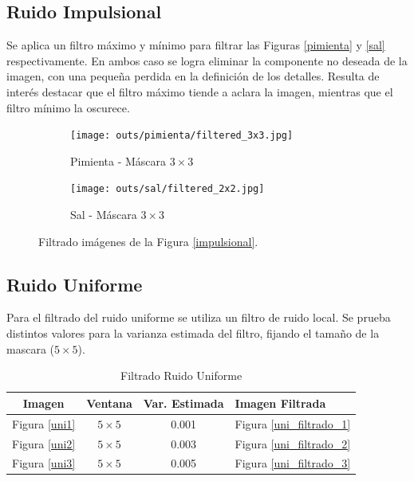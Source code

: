\documentclass[
  letterpaper,
  twocolumn,
  9pt,
  journal,
  final]{IEEEtran}
\begin{document}
\subsection{Ruido Impulsional}

Se aplica un filtro máximo y mínimo para filtrar las Figuras \ref{pimienta} y \ref{sal} respectivamente. En ambos caso se logra eliminar la componente no deseada de la imagen, con una pequeña perdida en la definición de los detalles. Resulta de interés destacar que el filtro máximo tiende a aclara la imagen, mientras que el filtro mínimo la oscurece.

\begin{figure}[!tbh]
  \centering
  \begin{subfigure}[b]{.4\linewidth}
    \texttt{[image: outs/pimienta/filtered\_3x3.jpg]}
    \caption{Pimienta - Máscara $3\times3$}\label{pimienta_filtrado}
  \end{subfigure}
  \begin{subfigure}[b]{.40\linewidth}
    \texttt{[image: outs/sal/filtered\_2x2.jpg]}
    \caption{Sal - Máscara $3\times3$}\label{sal_filtrado}
  \end{subfigure}
  \caption{Filtrado imágenes de la Figura \ref{impulsional}.}
  \label{gauss_filtrado}
\end{figure}

\subsection{Ruido Uniforme}

Para el filtrado del ruido uniforme se utiliza un filtro de ruido local. Se prueba distintos valores para la varianza estimada del filtro, fijando el tamaño de la mascara ($5 \times 5$).

\begin{table}[!tbh]
  \centering
  \caption{Filtrado Ruido Uniforme} \label{tab_gauss}
  \begin{tabular}{cccl}
  Imagen & Ventana & Var. Estimada & Imagen Filtrada \\ \hline
  Figura \ref{uni1}     & $5\times5$      & 0.001            & Figura \ref{uni_filtrado_1}               \\
  Figura \ref{uni2}     & $5\times5$      & 0.003            & Figura \ref{uni_filtrado_2}               \\
  Figura \ref{uni3}     & $5\times5$      & 0.005            & Figura \ref{uni_filtrado_3}
  \end{tabular}
\end{table}
\end{document}
